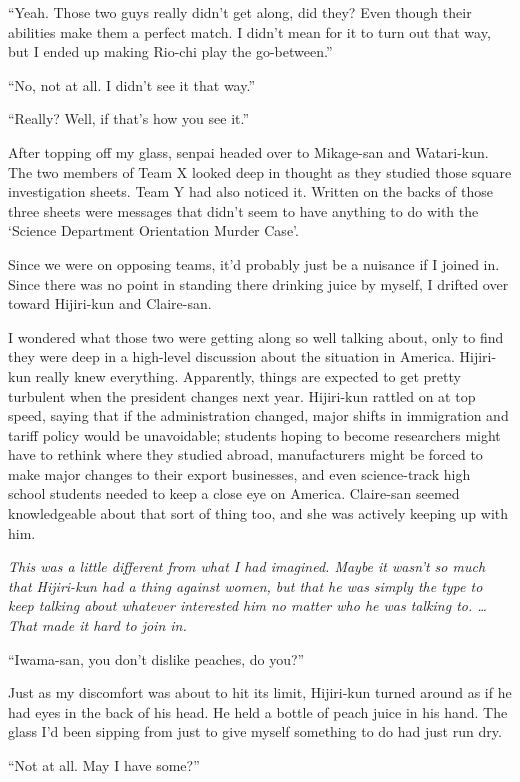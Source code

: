 \documentclass[
    a4paper,
    12pt,
    twoside,
    openany,
    UTF8,
    fontset=windows
]{ctexbook}
\begin{document}
``Yeah. Those two guys really didn't get along, did they? Even though their abilities make them a perfect match. I didn't mean for it to turn out that way, but I ended up making Rio-chi play the go-between.''

``No, not at all. I didn't see it that way.''

``Really? Well, if that's how you see it.''

After topping off my glass, senpai headed over to Mikage-san and Watari-kun. The two members of Team X looked deep in thought as they studied those square investigation sheets. Team Y had also noticed it. Written on the backs of those three sheets were messages that didn't seem to have anything to do with the `Science Department Orientation Murder Case'.

Since we were on opposing teams, it'd probably just be a nuisance if I joined in. Since there was no point in standing there drinking juice by myself, I drifted over toward Hijiri-kun and Claire-san.

I wondered what those two were getting along so well talking about, only to find they were deep in a high-level discussion about the situation in America. Hijiri-kun really knew everything. Apparently, things are expected to get pretty turbulent when the president changes next year. Hijiri-kun rattled on at top speed, saying that if the administration changed, major shifts in immigration and tariff policy would be unavoidable; students hoping to become researchers might have to rethink where they studied abroad, manufacturers might be forced to make major changes to their export businesses, and even science-track high school students needed to keep a close eye on America. Claire-san seemed knowledgeable about that sort of thing too, and she was actively keeping up with him.

\textit{This was a little different from what I had imagined. Maybe it wasn't so much that Hijiri-kun had a thing against women, but that he was simply the type to keep talking about whatever interested him no matter who he was talking to. \dots That made it hard to join in.}

``Iwama-san, you don't dislike peaches, do you?''

Just as my discomfort was about to hit its limit, Hijiri-kun turned around as if he had eyes in the back of his head. He held a bottle of peach juice in his hand. The glass I'd been sipping from just to give myself something to do had just run dry.

``Not at all. May I have some?''
\end{document}
